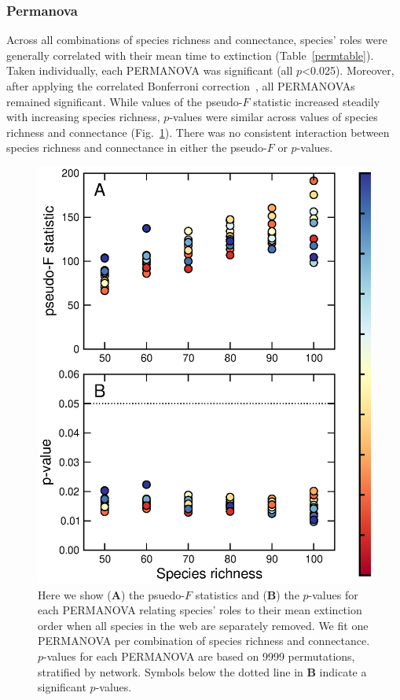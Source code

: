 \documentclass[12pt]{article}
\begin{document}
		\subsubsection*{Permanova}

			Across all combinations of species richness and connectance, species' roles were generally correlated with their mean time to extinction (Table~\ref{permtable}). Taken individually, each PERMANOVA was significant (all $p$\textless0.025). Moreover, after applying the correlated Bonferroni correction~\citep{Drezner2016}, all PERMANOVAs remained significant. While values of the pseudo-$F$ statistic increased steadily with increasing species richness, $p$-values were similar across values of species richness and connectance (Fig.~\ref{permfig}). There was no consistent interaction between species richness and connectance in either the pseudo-$F$ or $p$-values.



			\begin{figure}[h!]
				\caption{Here we show (\textbf{A}) the psuedo-$F$ statistics and (\textbf{B}) the $p$-values for each PERMANOVA relating species' roles to their mean extinction order when all species in the web are separately removed. We fit one PERMANOVA per combination of species richness and connectance. $p$-values for each PERMANOVA are based on 9999 permutations, stratified by network. Symbols below the dotted line in \textbf{B} indicate a significant $p$-values.}
				\label{permfig}
				\includegraphics[height=.75\textheight]{figures/extinction_order/permanova_summary_paper_full.eps}
				\end{figure}
\end{document}
